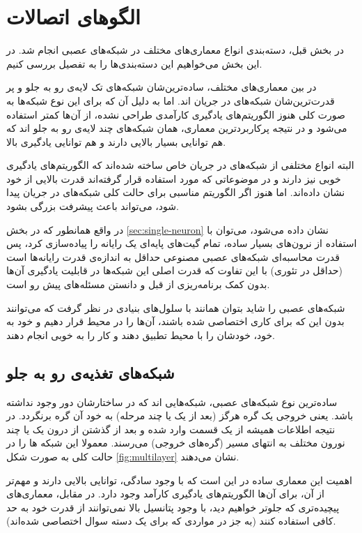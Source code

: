 \documentclass[11pt,a4paper,twocolumn]{article}
\begin{document}
\section{الگو‌های اتصالات}
در بخش قبل، دسته‌بندی انواع معماری‌های مختلف در شبکه‌های عصبی انجام شد. در این بخش می‌‌خواهیم این دسته‌بندی‌ها را به تفصیل بررسی کنیم.

در بین معماری‌های مختلف، ساده‌ترین‌شان شبکه‌های تک لایه‌ی رو به جلو و پر قدرت‌ترین‌شان شبکه‌های در جریان اند. اما به دلیل آن که برای این نوع شبکه‌ها به صورت کلی هنوز الگوریتم‌های یادگیری کارآمدی طراحی نشده، از آن‌ها کمتر استفاده می‌شود و در نتیجه پرکاربرد‌ترین معماری، همان شبکه‌های چند لایه‌ی رو به جلو اند که هم توانایی بسیار بالایی دارند و هم توانایی یادگیری بالا.

البته انواع مختلفی از شبکه‌های در جریان خاص ساخته شده‌اند که الگوریتم‌های یادگیری خوبی نیز دارند و در موضوعاتی که مورد استفاده قرار گرفته‌اند قدرت بالایی از خود نشان داده‌اند. اما هنوز اگر الگوریتم مناسبی برای حالت کلی شبکه‌های در جریان پیدا شود، می‌تواند باعث پیشرفت بزرگی بشود.

در واقع همانطور که در بخش
\ref{sec:single-neuron}
نشان داده می‌شود، می‌توان با استفاده از نرون‌های بسیار ساده، تمام گیت‌های پایه‌ای یک رایانه را پیاده‌‌سازی کرد، پس قدرت محاسبه‌ای شبکه‌های عصبی مصنوعی حداقل به اندازه‌ی قدرت رایانه‌ها است (حداقل در تئوری) با این تفاوت که قدرت اصلی این شبکه‌ها در قابلیت یادگیری آن‌ها بدون کمک برنامه‌ریزی از قبل و دانستن مسئله‌های پیش رو است.

شبکه‌های عصبی را شاید بتوان همانند با سلول‌های بنیادی در نظر گرفت که می‌توانند بدون این که برای کاری اختصاصی شده باشند، آن‌ها را در محیط قرار دهیم و خود به خود، خودشان را با محیط تطبیق دهند و کار را به خوبی انجام دهند.
\subsection{شبکه‌های تغذیه‌ی رو به جلو}
ساده‌ترین نوع شبکه‌های عصبی،‌ شبکه‌هایی اند که در ساختارشان دور وجود نداشته باشد. یعنی خروجی یک گره هرگز (بعد از یک یا چند مرحله) به خود آن گره برنگردد. در نتیجه اطلاعات همیشه از یک قسمت وارد شده و بعد از گذشتن از درون یک یا چند نورون‌ مختلف به انتهای مسیر (گره‌های خروجی)‌ می‌رسند. معمولا این شبکه ها را در حالت کلی به صورت شکل 
\ref{fig:multilayer}
نشان می‌دهند.

اهمیت این معماری ساده در این است که با وجود سادگی،‌ توانایی بالایی دارند و مهم‌تر از آن، برای آن‌ها الگوریتم‌های یادگیری کارآمد وجود دارد. در مقابل، معماری‌های پیچیده‌تری که جلو‌تر خواهیم دید، با وجود پتانسیل بالا نمی‌توانند از قدرت خود به حد کافی استفاده کنند (به جز در مواردی که برای یک دسته سوال اختصاصی شده‌اند).
\end{document}
